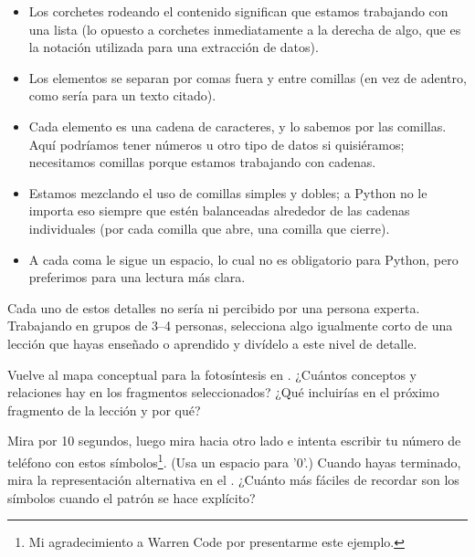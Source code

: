 \begin{itemize}

\item
  Los corchetes rodeando el contenido significan que estamos trabajando con una lista
  (lo opuesto a corchetes inmediatamente a la derecha de algo,
  que es la notación utilizada para una extracción de datos).

\item
  Los elementos se separan por comas fuera y entre comillas
  (en vez de adentro, como sería para un texto citado).

\item
  Cada elemento es una cadena de caracteres,
  y lo sabemos por las comillas.
  Aquí podríamos tener números u otro tipo de datos si quisiéramos;
  necesitamos comillas porque estamos trabajando con cadenas.

\item
  Estamos mezclando el uso de comillas simples y dobles;
  a Python no le importa eso siempre que estén balanceadas alrededor de las cadenas individuales (por cada comilla que abre, una comilla que cierre).

\item
  A cada coma le sigue un espacio,
  lo cual no es obligatorio para Python,
  pero preferimos para una lectura más clara.

\end{itemize}

Cada uno de estos detalles no sería ni percibido por una persona experta.
Trabajando en grupos de  3--4 personas,
selecciona algo igualmente corto de una lección que hayas enseñado o aprendido
y divídelo a este nivel de detalle.


Vuelve al mapa conceptual para la fotosíntesis en .
¿Cuántos conceptos y relaciones hay en los fragmentos seleccionados?
¿Qué incluirías en el próximo fragmento de la lección y por qué?


Mira  por 10 segundos,
luego mira hacia otro lado e intenta escribir tu número de teléfono con estos símbolos\footnote{
  Mi agradecimiento a Warren Code por presentarme este ejemplo.
}.
(Usa un espacio para '0'.)
Cuando hayas terminado,
mira la representación alternativa en el .
¿Cuánto más fáciles de recordar son los símbolos cuando el patrón se hace explícito?

